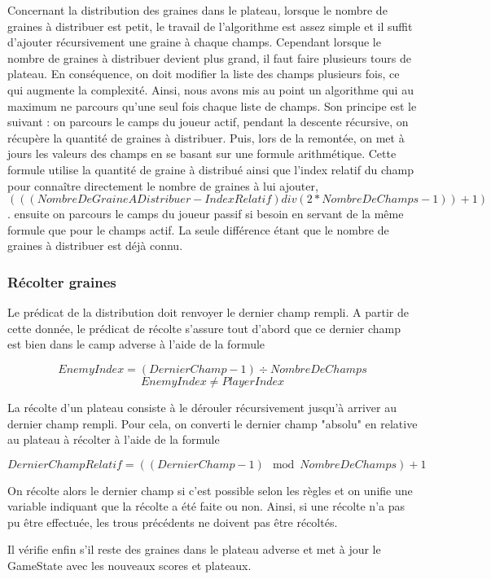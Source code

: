 \documentclass[]{article}
\begin{document}
	Concernant la distribution des graines dans le plateau, lorsque le nombre de graines à distribuer est petit, le travail de l'algorithme est assez simple et il suffit d'ajouter récursivement une graine à chaque champs.
Cependant lorsque le nombre de graines à distribuer devient plus grand, il faut faire plusieurs tours de plateau. En conséquence, on doit modifier la liste des champs plusieurs fois, ce qui augmente la complexité.
Ainsi, nous avons mis au point un algorithme qui au maximum ne parcours qu'une seul fois chaque liste de champs.
Son principe est le suivant :
	on parcours le camps du joueur actif, pendant la descente récursive, on récupère la quantité de graines à distribuer. Puis, lors de la remontée, on met à jours les valeurs des champs en se basant sur une formule arithmétique. Cette formule utilise la quantité de graine à distribué ainsi que l'index relatif du champ pour connaître directement le nombre de graines à lui ajouter, $$(((NombreDeGraineADistribuer-IndexRelatif) div (2*NombreDeChamps-1)) + 1)$$.
	ensuite on parcours le camps du joueur passif si besoin en servant de la même formule que pour le champs actif. La seule différence étant que le nombre de graines à distribuer est déjà connu.

\subsubsection{Récolter graines}

Le prédicat de la distribution doit renvoyer le dernier champ rempli. A partir de cette donnée, le prédicat de récolte s'assure tout d'abord que ce dernier champ est bien dans le camp adverse à l'aide de la formule 

$$EnemyIndex = (DernierChamp-1) \div NombreDeChamps$$
$$EnemyIndex \neq PlayerIndex$$

La récolte d'un plateau consiste à le dérouler récursivement jusqu'à arriver au dernier champ rempli. Pour cela, on converti le dernier champ "absolu" en relative au plateau à récolter à l'aide de la formule

$$DernierChampRelatif = ((DernierChamp-1) \mod NombreDeChamps) + 1$$

On récolte alors le dernier champ si c'est possible selon les règles et on unifie une variable indiquant que la récolte a été faite ou non. Ainsi, si une récolte n'a pas pu être effectuée, les trous précédents ne doivent pas être récoltés.


Il vérifie enfin s'il reste des graines dans le plateau adverse et met à jour le GameState avec les nouveaux scores et plateaux. 
\end{document}
